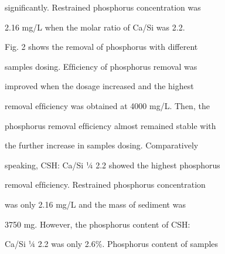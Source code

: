 \documentclass[a4paper,portrait,12pt]{article}
\begin{document}
\begin{flushleft}
signiﬁcantly. Restrained phosphorus concentration was
\end{flushleft}


\begin{flushleft}
2.16 mg/L when the molar ratio of Ca/Si was 2.2.
\end{flushleft}


\begin{flushleft}
Fig. 2 shows the removal of phosphorus with different
\end{flushleft}


\begin{flushleft}
samples dosing. Efﬁciency of phosphorus removal was
\end{flushleft}


\begin{flushleft}
improved when the dosage increased and the highest
\end{flushleft}


\begin{flushleft}
removal efﬁciency was obtained at 4000 mg/L. Then, the
\end{flushleft}


\begin{flushleft}
phosphorus removal efﬁciency almost remained stable with
\end{flushleft}


\begin{flushleft}
the further increase in samples dosing. Comparatively
\end{flushleft}


\begin{flushleft}
speaking, CSH: Ca/Si ¼ 2.2 showed the highest phosphorus
\end{flushleft}


\begin{flushleft}
removal efﬁciency. Restrained phosphorus concentration
\end{flushleft}


\begin{flushleft}
was only 2.16 mg/L and the mass of sediment was
\end{flushleft}


\begin{flushleft}
3750 mg. However, the phosphorus content of CSH:
\end{flushleft}


\begin{flushleft}
Ca/Si ¼ 2.2 was only 2.6\%. Phosphorus content of samples
\end{flushleft}
\end{document}
